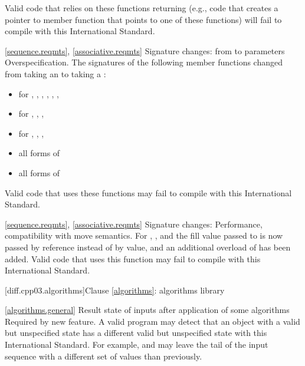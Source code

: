 Valid \CppIII code that relies on these functions returning 
(e.g., code that creates a pointer to member function that points to one
of these functions) will fail to compile with this International Standard.

\ref{sequence.reqmts}, \ref{associative.reqmts}
\change Signature changes: from  to 
parameters
\rationale Overspecification.
\effects
The signatures of the following member functions changed from taking an
 to taking a :

\begin{itemize}
\item {} for , , ,
, , , 
\item {} for , , ,
\item {} for , , , 
\item all forms of 
\item all forms of 
\end{itemize}

Valid \CppIII code that uses these functions may fail to compile with this
International Standard.

\ref{sequence.reqmts}, \ref{associative.reqmts}
\change Signature changes: 
\rationale Performance, compatibility with move semantics.
\effect
For , , and 
the fill value passed to  is now passed by reference instead of
by value, and an additional overload of  has been added. Valid
\CppIII code that uses this function may fail to compile with this International
Standard.

[diff.cpp03.algorithms]{Clause \ref{algorithms}: algorithms library}

\ref{algorithms.general}
\change Result state of inputs after application of some algorithms
\rationale Required by new feature.
\effect
A valid \CppIII program may detect that an object with a valid but
unspecified state has a different valid but unspecified state with this
International Standard. For example,  and
 may leave the tail of the input sequence with a
different set of values than previously.

